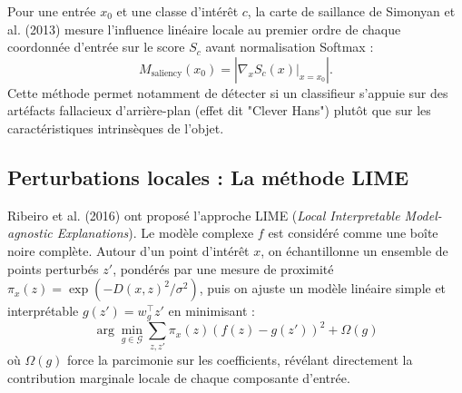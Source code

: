 Pour une entrée $x_0$ et une classe d'intérêt $c$, la carte de saillance de Simonyan et al. (2013) mesure l'influence linéaire locale au premier ordre de chaque coordonnée d'entrée sur le score $S_c$ avant normalisation Softmax :
\begin{equation}
    M_{\mathrm{saliency}}(x_0) = \left| \nabla_x S_c(x) \big|_{x = x_0} \right|.
\end{equation}
Cette méthode permet notamment de détecter si un classifieur s'appuie sur des artéfacts fallacieux d'arrière-plan (effet dit "Clever Hans") plutôt que sur les caractéristiques intrinsèques de l'objet.

\subsection{Perturbations locales : La méthode LIME}

Ribeiro et al. (2016) ont proposé l'approche LIME (\emph{Local Interpretable Model-agnostic Explanations}). Le modèle complexe $f$ est considéré comme une boîte noire complète. Autour d'un point d'intérêt $x$, on échantillonne un ensemble de points perturbés $z'$, pondérés par une mesure de proximité $\pi_x(z) = \exp(-D(x, z)^2 / \sigma^2)$, puis on ajuste un modèle linéaire simple et interprétable $g(z') = w_g^\top z'$ en minimisant :
\begin{equation}
    \arg\min_{g \in \mathcal{G}} \sum_{z, z'} \pi_x(z) \left( f(z) - g(z') \right)^2 + \Omega(g)
\end{equation}
où $\Omega(g)$ force la parcimonie sur les coefficients, révélant directement la contribution marginale locale de chaque composante d'entrée.